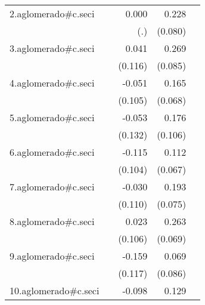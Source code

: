 {\begin{longtable}{l*{4}{D{.}{.}{-1}}}
\addlinespace
2.aglomerado#c.seci&                     &       0.000         &       0.228\sym{**} &                     \\
            &                     &         (.)         &     (0.080)         &                     \\
\addlinespace
3.aglomerado#c.seci&                     &       0.041         &       0.269\sym{**} &                     \\
            &                     &     (0.116)         &     (0.085)         &                     \\
\addlinespace
4.aglomerado#c.seci&                     &      -0.051         &       0.165\sym{*}  &                     \\
            &                     &     (0.105)         &     (0.068)         &                     \\
\addlinespace
5.aglomerado#c.seci&                     &      -0.053         &       0.176         &                     \\
            &                     &     (0.132)         &     (0.106)         &                     \\
\addlinespace
6.aglomerado#c.seci&                     &      -0.115         &       0.112         &                     \\
            &                     &     (0.104)         &     (0.067)         &                     \\
\addlinespace
7.aglomerado#c.seci&                     &      -0.030         &       0.193\sym{**} &                     \\
            &                     &     (0.110)         &     (0.075)         &                     \\
\addlinespace
8.aglomerado#c.seci&                     &       0.023         &       0.263\sym{***}&                     \\
            &                     &     (0.106)         &     (0.069)         &                     \\
\addlinespace
9.aglomerado#c.seci&                     &      -0.159         &       0.069         &                     \\
            &                     &     (0.117)         &     (0.086)         &                     \\
\addlinespace
10.aglomerado#c.seci&                     &      -0.098         &       0.129\sym{*}  &                     \\

\end{longtable}}
